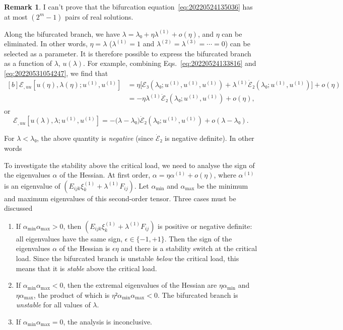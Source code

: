 \documentclass[12pt, final]{scrartcl}
\theoremstyle{definition}
\newtheorem{remark}{Remark}
\newcommand{\order}[2][1]{#2^{(#1)}}
\begin{document}
\begin{remark}
  I can't prove that the bifurcation equation~\eqref{eq:20220524135036} has at
  most \((2^m - 1)\) pairs of real solutions.
\end{remark}

Along the bifurcated branch, we have \(λ = λ₀ + η \order[1]λ + o(η)\), and \(η\) can be
eliminated. In other words, \(η=λ\) (\(\order[1]λ=1\) and \(\order[2]λ = \order[3]λ = \cdots = 0\)) can
be selected as a parameter. It is therefore possible to express the bifurcated
branch as a function of \(λ\), \(u(λ)\). For example, combining
Eqs.~\eqref{eq:20220524133816} and \eqref{eq:20220531054247}, we find that
\begin{equation}
  \begin{aligned}[b]
    ℰ_{, uu}[u(η), λ(η); \order[1]u, \order[1]u]
    &= η \bigl[ℰ₃(λ₀ ; \order[1]u, \order[1]u, \order[1]u)  + \order[1]λ \dot{ℰ}₂(λ₀; \order[1]u, \order[1]u)\bigr] + o(η)\\
    &= - η \order[1]λ \dot{ℰ}₂(λ₀; \order[1]u, \order[1]u) + o(η),
  \end{aligned}
\end{equation}
or
\begin{equation}
  \label{eq:20220819160235}
  ℰ_{, uu}[u(λ), λ; \order[1]u, \order[1]u] = -\bigl( λ - λ₀ \bigr) \dot{ℰ}₂(λ₀; \order[1]u, \order[1]u) + o(λ - λ₀).
\end{equation}

For \(λ < λ₀\), the above quantity is \emph{negative} (since \(\dot{ℰ}₂\) is
negative definite). In other words

\begin{center}
\end{center}

To investigate the stability above the critical load, we need to analyse the
sign of the eigenvalues \(α\) of the Hessian. At first order,
\(α = η \order[1]α + o(η)\), where \(\order[1]α\) is an eigenvalue of
\((E_{ijk} \order[1]{ξ_k} + \order[1]λ F_{ij})\). Let \(α_{\min}\) and \(α_{\max}\) be the minimum
and maximum eigenvalues of this second-order tensor. Three cases must be
discussed
\begin{enumerate}
\item If \(α_{\min} α_{\max} > 0\), then \((E_{ijk} \order[1]{ξ_k} + \order[1]λ F_{ij})\) is
  positive or negative definite: all eigenvalues have the same sign,
  \(\epsilon ∈ \{-1, +1\}\). Then the sign of the eigenvalues \(α\) of the
  Hessian is \(\epsilon η\) and there is a stability switch at the critical
  load. Since the bifurcated branch is unstable \emph{below} the critical load,
  this means that it is \emph{stable} above the critical load.
\item If \(α_{\min} α_{\max} < 0\), then the extremal eigenvalues of the Hessian
  are \(η α_{\min}\) and \(η α_{\max}\), the product of which is
  \(η² α_{\min} α_{\max} < 0\). The bifurcated branch is \emph{unstable} for all
  values of \(λ\).
\item If \(α_{\min} α_{\max} = 0\), the analysis is inconclusive.
\end{enumerate}
\end{document}
